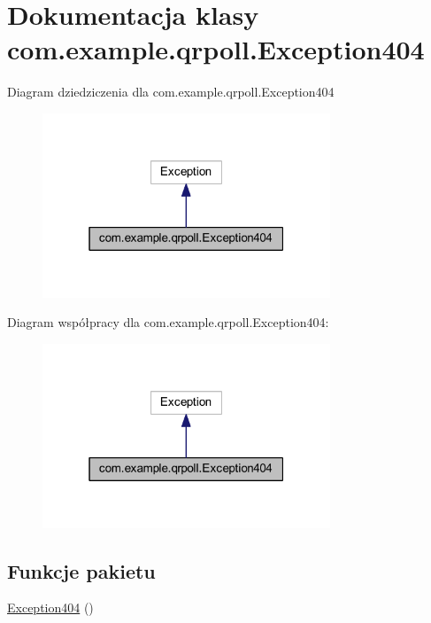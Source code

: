 \hypertarget{classcom_1_1example_1_1qrpoll_1_1_exception404}{\section{Dokumentacja klasy com.\+example.\+qrpoll.\+Exception404}
\label{classcom_1_1example_1_1qrpoll_1_1_exception404}
}


Diagram dziedziczenia dla com.\+example.\+qrpoll.\+Exception404\nopagebreak
\begin{figure}[H]
\begin{center}
\leavevmode
\includegraphics[width=244pt]{classcom_1_1example_1_1qrpoll_1_1_exception404__inherit__graph}
\end{center}
\end{figure}


Diagram współpracy dla com.\+example.\+qrpoll.\+Exception404\+:\nopagebreak
\begin{figure}[H]
\begin{center}
\leavevmode
\includegraphics[width=244pt]{classcom_1_1example_1_1qrpoll_1_1_exception404__coll__graph}
\end{center}
\end{figure}
\subsection*{Funkcje pakietu}
\begin{DoxyCompactItemize}
\item 
\hyperlink{classcom_1_1example_1_1qrpoll_1_1_exception404_a8927591383f273a89d49e4bf6f536961}{Exception404} ()
\end{DoxyCompactItemize}


